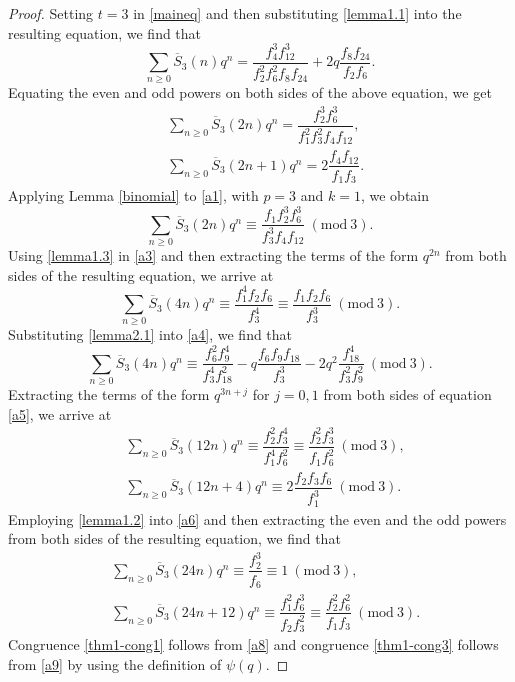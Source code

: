 \documentclass[10pt,a4paper]{amsart}
\begin{document}
\begin{proof} Setting $t=3$ in \eqref{maineq} and then substituting \eqref{lemma1.1} into the resulting equation, we find that
\[
\sum_{n \geq 0} \overline{S}_{3}(n) q^{n} = \dfrac{f_{4}^{3} f_{12}^{3}}{f_{2}^{2} f_{6}^{2} f_{8} f_{24}} + 2q \dfrac{f_{8} f_{24}}{f_{2} f_{6}}.
\]
Equating the even and odd powers on both sides of the above equation, we get
\begin{align}
&\sum_{n \geq 0} \overline{S}_{3}(2n) q^{n} = \dfrac{f_{2}^{3} f_{6}^{3}}{f_{1}^{2} f_{3}^{2} f_{4} f_{12}}, \label{a1}\\
&\sum_{n \geq 0} \overline{S}_{3}(2n+1) q^{n} = 2\dfrac{f_{4} f_{12}}{f_{1} f_{3}}. \label{a2}
\end{align}
Applying Lemma \ref{binomial} to \eqref{a1}, with $p=3$ and $k=1$, we obtain
\begin{equation}
\sum_{n \geq 0} \overline{S}_{3}(2n) q^{n} \equiv  \dfrac{f_{1} f_{2}^{3} f_{6}^{3}} {f_{3}^{3} f_{4} f_{12}} \ (\mathrm{mod} \ 3). \label{a3}
\end{equation}
Using \eqref{lemma1.3} in \eqref{a3} and then extracting the terms of the form $q^{2n}$ from both sides of the resulting equation, we arrive at
\begin{equation}
\sum_{n \geq 0} \overline{S}_{3}(4n) q^{n} \equiv  \dfrac{f_{1}^{4} f_{2} f_{6}} {f_{3}^{4}} \equiv \dfrac{f_{1} f_{2} f_{6}} {f_{3}^{3}}  \ (\mathrm{mod} \ 3). \label{a4}
\end{equation}
Substituting \eqref{lemma2.1} into \eqref{a4}, we find that
\begin{equation}
\sum_{n \geq 0} \overline{S}_{3}(4n) q^{n} \equiv  \dfrac{f_{6}^{2} f_{9}^{4}} {f_{3}^{4} f_{18}^{2}} - q \dfrac{f_{6} f_ {9} f_{18}}{f_{3}^{3}} -2q^{2} \dfrac{f_{18}^{4}}{f_{3}^{2} f_{9}^{2}}  \ (\mathrm{mod} \ 3). \label{a5}
\end{equation}
Extracting the terms of the form $q^{3n+j}$ for $j=0,1$  from both sides of equation \eqref{a5}, we arrive at
\begin{align}
&\sum_{n \geq 0} \overline{S}_{3}(12n) q^{n} \equiv  \dfrac{f_{2}^{2} f_{3}^{4}} {f_{1}^{4} f_{6}^{2}} \equiv \dfrac{f_{2}^{2} f_{3}^{3}} {f_{1} f_{6}^{2}}   \ (\mathrm{mod} \ 3), \label{a6}\\
&\sum_{n \geq 0} \overline{S}_{3}(12n+4) q^{n} \equiv  2 \dfrac{f_{2} f_ {3} f_{6}}{f_{1}^{3}}  \ (\mathrm{mod} \ 3). \label{a7}
\end{align}
Employing \eqref{lemma1.2} into \eqref{a6} and then extracting the even and the odd powers from both sides of the resulting equation, we find that
\begin{align}
&\sum_{n \geq 0} \overline{S}_{3}(24n) q^{n} \equiv  \dfrac{f_{2}^{3}} {f_{6}} \equiv 1 \ (\mathrm{mod} \ 3), \label{a8}\\
&\sum_{n \geq 0} \overline{S}_{3}(24n+12) q^{n} \equiv   \dfrac{f_{1}^{2} f_ {6}^{3}}{f_{2} f_  {3}^{2}} \equiv \dfrac{f_{2}^{2} f_ {6}^{2}}{f_{1} f_{3}}  \ (\mathrm{mod} \ 3). \label{a9}
\end{align}
Congruence \eqref{thm1-cong1} follows from \eqref{a8} and congruence \eqref{thm1-cong3} follows from \eqref{a9} by using the definition of $\psi(q)$.


\end{proof}
\end{document}
